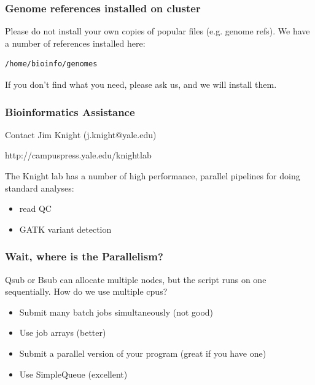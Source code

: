 \documentclass[10pt]{beamer}
\begin{document}
\begin{frame}[fragile]
\frametitle{Genome references installed on cluster}

Please do not install your own copies of popular files (e.g. genome refs).  
\vskip10pt
We have a number of references installed here:
\begin{verbatim}
/home/bioinfo/genomes
\end{verbatim}

If you don't find what you need, please ask us, and we will install them.

\end{frame}

\begin{frame}[fragile]
\frametitle{Bioinformatics Assistance}

Contact Jim Knight (j.knight@yale.edu)

http://campuspress.yale.edu/knightlab

The Knight lab has a number of high performance, parallel pipelines for
doing standard analyses:

\begin{itemize}
\item read QC
\item GATK variant detection
\end{itemize}
\end{frame}


\begin{frame}[fragile]
\frametitle{Wait, where is the Parallelism?}

Qsub or Bsub can allocate multiple nodes, but the script runs on one sequentially.  How do we use multiple cpus?

\begin{itemize}
\item Submit many batch jobs simultaneously (not good)
\item Use job arrays (better)
\item Submit a parallel version of your program (great if you have one)
\item Use SimpleQueue (excellent)
\end{itemize}

\end{frame}
\end{document}
